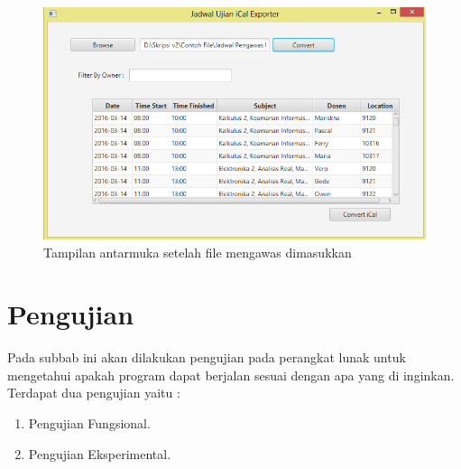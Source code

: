 \begin{enumerate}
		\begin{figure}[H]
		\centering
		\includegraphics[scale=0.7]{Gambar/implementAntarmuka2}
		\caption{Tampilan antarmuka setelah file mengawas dimasukkan}
		\label{fig:implementAntarmuka}
		\end{figure}
\end{enumerate}

\section{Pengujian}
Pada subbab ini akan dilakukan pengujian pada perangkat lunak untuk mengetahui apakah program dapat berjalan sesuai dengan apa yang di inginkan. Terdapat dua pengujian yaitu :
\begin{enumerate}
	\item Pengujian Fungsional.
	\item Pengujian Eksperimental.
\end{enumerate}

